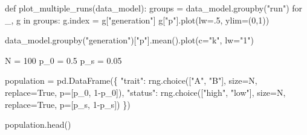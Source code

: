 \documentclass[
  a4paperpaper,
  ,captions=tableheading
]{scrbook}
\newenvironment{Shaded}{\begin{snugshade}}{\end{snugshade}}
\newcommand{\ControlFlowTok}[1]{\textcolor[rgb]{0.00,0.23,0.31}{#1}}
\newcommand{\DecValTok}[1]{\textcolor[rgb]{0.68,0.00,0.00}{#1}}
\newcommand{\FloatTok}[1]{\textcolor[rgb]{0.68,0.00,0.00}{#1}}
\newcommand{\KeywordTok}[1]{\textcolor[rgb]{0.00,0.23,0.31}{#1}}
\newcommand{\NormalTok}[1]{\textcolor[rgb]{0.00,0.23,0.31}{#1}}
\newcommand{\OperatorTok}[1]{\textcolor[rgb]{0.37,0.37,0.37}{#1}}
\newcommand{\StringTok}[1]{\textcolor[rgb]{0.13,0.47,0.30}{#1}}
\newcommand{\VariableTok}[1]{\textcolor[rgb]{0.07,0.07,0.07}{#1}}
\begin{document}
\begin{Shaded}
\begin{Highlighting}[]
\KeywordTok{def}\NormalTok{ plot\_multiple\_runs(data\_model):}
\NormalTok{    groups }\OperatorTok{=}\NormalTok{ data\_model.groupby(}\StringTok{"run"}\NormalTok{)}
    \ControlFlowTok{for}\NormalTok{ \_, g }\KeywordTok{in}\NormalTok{ groups:}
\NormalTok{        g.index }\OperatorTok{=}\NormalTok{ g[}\StringTok{"generation"}\NormalTok{]}
\NormalTok{        g[}\StringTok{"p"}\NormalTok{].plot(lw}\OperatorTok{=}\FloatTok{.5}\NormalTok{, ylim}\OperatorTok{=}\NormalTok{(}\DecValTok{0}\NormalTok{,}\DecValTok{1}\NormalTok{))}

\NormalTok{    data\_model.groupby(}\StringTok{"generation"}\NormalTok{)[}\StringTok{"p"}\NormalTok{].mean().plot(c}\OperatorTok{=}\StringTok{"k"}\NormalTok{, lw}\OperatorTok{=}\StringTok{"1"}\NormalTok{)}
\end{Highlighting}
\end{Shaded}

\begin{Shaded}
\begin{Highlighting}[]
\NormalTok{N }\OperatorTok{=} \DecValTok{100}
\NormalTok{p\_0 }\OperatorTok{=} \FloatTok{0.5}
\NormalTok{p\_s }\OperatorTok{=} \FloatTok{0.05}
\end{Highlighting}
\end{Shaded}

\begin{Shaded}
\begin{Highlighting}[]
\NormalTok{population }\OperatorTok{=}\NormalTok{ pd.DataFrame(\{}
    \StringTok{"trait"}\NormalTok{: rng.choice([}\StringTok{"A"}\NormalTok{, }\StringTok{"B"}\NormalTok{], size}\OperatorTok{=}\NormalTok{N, replace}\OperatorTok{=}\VariableTok{True}\NormalTok{, p}\OperatorTok{=}\NormalTok{[p\_0, }\DecValTok{1}\OperatorTok{{-}}\NormalTok{p\_0]),}
    \StringTok{"status"}\NormalTok{: rng.choice([}\StringTok{"high"}\NormalTok{, }\StringTok{"low"}\NormalTok{], size}\OperatorTok{=}\NormalTok{N, replace}\OperatorTok{=}\VariableTok{True}\NormalTok{, p}\OperatorTok{=}\NormalTok{[p\_s, }\DecValTok{1}\OperatorTok{{-}}\NormalTok{p\_s])}
\NormalTok{\})}
\end{Highlighting}
\end{Shaded}

\begin{Shaded}
\begin{Highlighting}[]
\NormalTok{population.head()}
\end{Highlighting}
\end{Shaded}
\end{document}
